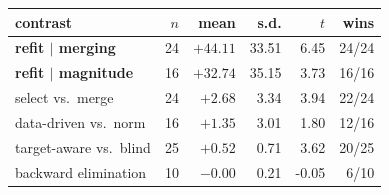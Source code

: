 \begin{tabular}{lrrrrr}
\toprule
contrast & $n$ & mean & s.d. & $t$ & wins\\
\midrule
\textbf{refit $\mid$ merging} & 24 & $\mathbf{+44.11}$ & 33.51 & 6.45 & 24/24\\
\textbf{refit $\mid$ magnitude} & 16 & $\mathbf{+32.74}$ & 35.15 & 3.73 & 16/16\\
select vs.\ merge & 24 & $+2.68$ & 3.34 & 3.94 & 22/24\\
data-driven vs.\ norm & 16 & $+1.35$ & 3.01 & 1.80 & 12/16\\
target-aware vs.\ blind & 25 & $+0.52$ & 0.71 & 3.62 & 20/25\\
backward elimination & 10 & $-0.00$ & 0.21 & -0.05 & 6/10\\
\bottomrule
\end{tabular}
